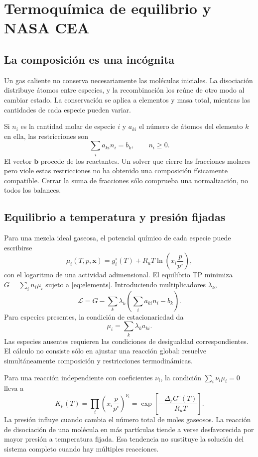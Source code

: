 \chapter{Termoquímica de equilibrio y NASA CEA}\label{ch:15}
\section{La composición es una incógnita}
Un gas caliente no conserva necesariamente las moléculas iniciales. La disociación distribuye átomos entre especies, y la recombinación los reúne de otro modo al cambiar estado. La conservación se aplica a elementos y masa total, mientras las cantidades de cada especie pueden variar.

Si $n_i$ es la cantidad molar de especie $i$ y $a_{ki}$ el número de átomos del elemento $k$ en ella, las restricciones son
\begin{equation}\label{eq:elements}
 \sum_i a_{ki}n_i=b_k,\qquad n_i\geq0.
\end{equation}
El vector $\mathbf b$ procede de los reactantes. Un solver que cierre las fracciones molares pero viole estas restricciones no ha obtenido una composición físicamente compatible. Cerrar la suma de fracciones sólo comprueba una normalización, no todos los balances.
\section{Equilibrio a temperatura y presión fijadas}
Para una mezcla ideal gaseosa, el potencial químico de cada especie puede escribirse
\[
 \mu_i(T,p,\mathbf x)=g_i^\circ(T)+R_uT\ln\left(x_i\frac{p}{p^\circ}\right),
\]
con el logaritmo de una actividad adimensional. El equilibrio TP minimiza $G=\sum_i n_i\mu_i$ sujeto a \eqref{eq:elements}. Introduciendo multiplicadores $\lambda_k$,
\[
 \mathcal L=G-\sum_k\lambda_k\left(\sum_i a_{ki}n_i-b_k\right).
\]
Para especies presentes, la condición de estacionariedad da
\[
 \mu_i=\sum_k\lambda_ka_{ki}.
\]
Las especies ausentes requieren las condiciones de desigualdad correspondientes. El cálculo no consiste sólo en ajustar una reacción global: resuelve simultáneamente composición y restricciones termodinámicas.\cite{CEA-RP1}

Para una reacción independiente con coeficientes $\nu_i$, la condición $\sum_i\nu_i\mu_i=0$ lleva a
\[
 K_p(T)=\prod_i\left(x_i\frac{p}{p^\circ}\right)^{\nu_i}
 =\exp\left[-\frac{\Delta_rG^\circ(T)}{R_uT}\right].
\]
La presión influye cuando cambia el número total de moles gaseosos. La reacción de disociación de una molécula en más partículas tiende a verse desfavorecida por mayor presión a temperatura fijada. Esa tendencia no sustituye la solución del sistema completo cuando hay múltiples reacciones.

